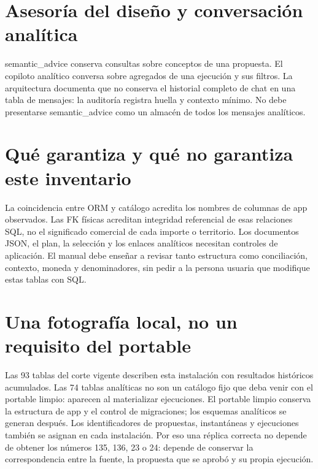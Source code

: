 \section{Asesoría del diseño y conversación analítica}
semantic\_\allowbreak{}advice conserva consultas sobre conceptos de una propuesta. El copiloto analítico conversa sobre agregados de una ejecución y sus filtros. La arquitectura documenta que no conserva el historial completo de chat en una tabla de mensajes: la auditoría registra huella y contexto mínimo. No debe presentarse semantic\_\allowbreak{}advice como un almacén de todos los mensajes analíticos.

\section{Qué garantiza y qué no garantiza este inventario}
La coincidencia entre ORM y catálogo acredita los nombres de columnas de app observados. Las FK físicas acreditan integridad referencial de esas relaciones SQL, no el significado comercial de cada importe o territorio. Los documentos JSON, el plan, la selección y los enlaces analíticos necesitan controles de aplicación. El manual debe enseñar a revisar tanto estructura como conciliación, contexto, moneda y denominadores, sin pedir a la persona usuaria que modifique estas tablas con SQL.

\section{Una fotografía local, no un requisito del portable}
Las 93 tablas del corte vigente describen esta instalación con resultados históricos acumulados. Las 74 tablas analíticas no son un catálogo fijo que deba venir con el portable limpio: aparecen al materializar ejecuciones. El portable limpio conserva la estructura de app y el control de migraciones; los esquemas analíticos se generan después. Los identificadores de propuestas, instantáneas y ejecuciones también se asignan en cada instalación. Por eso una réplica correcta no depende de obtener los números 135, 136, 23 o 24: depende de conservar la correspondencia entre la fuente, la propuesta que se aprobó y su propia ejecución.

